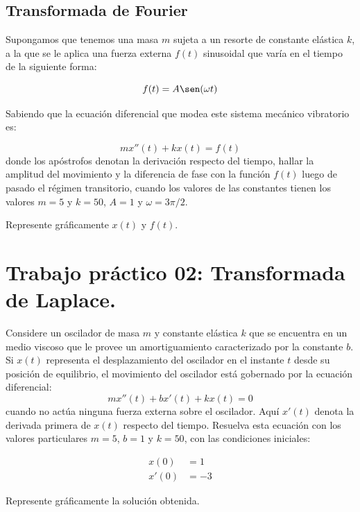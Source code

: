 \documentclass[11pt]{article}
\begin{document}
\subsection{Transformada de Fourier}
Supongamos que tenemos una masa $m$ sujeta a un resorte de constante elástica $k$, a la que se le aplica una fuerza externa $f(t)$ sinusoidal que varía en el tiempo de la siguiente forma:

\begin{equation}
f(t) = A \sen(\omega t)
\end{equation}

Sabiendo que la ecuación diferencial que modea este sistema mecánico vibratorio es:

\begin{equation}
m x''(t) + k x(t) = f(t)
\end{equation}
donde los apóstrofos denotan la derivación respecto del tiempo, hallar la amplitud del movimiento y la diferencia de fase con la función $f(t)$ luego de pasado el régimen transitorio, cuando los valores de las constantes tienen los valores  $m = 5$ y $k = 50$, $A = 1$ y $\omega = 3 \pi / 2$.

Represente gráficamente $x(t)$ y $f(t)$.


\section{Trabajo práctico 02: Transformada de Laplace.}
Considere un oscilador de masa $m$ y constante elástica $k$ que se encuentra en un medio viscoso que le provee un amortiguamiento caracterizado por la constante $b$. Si $x(t)$ representa el desplazamiento del oscilador en el instante $t$ desde su posición de equilibrio, el movimiento del oscilador está gobernado por la ecuación diferencial:
\begin{equation}
    m x''(t) + b x'(t) + k x(t) = 0
\end{equation}
cuando no actúa ninguna fuerza externa sobre el oscilador. Aquí $x'(t)$ denota la derivada primera de $x(t)$ respecto del tiempo. Resuelva esta ecuación con los valores particulares $m = 5$, $b = 1$ y $k = 50$, con las condiciones iniciales:

\begin{equation}
\begin{aligned}
    x(0) &= 1 \\
    x'(0) &= -3
\end{aligned}
\end{equation}

Represente gráficamente la solución obtenida.
\end{document}
